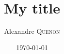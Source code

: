 \documentclass[%
	papersize=a4,%
	pagelayout=default,%
	fontname=latinmodern,%
	fontsize=11pt,%
	twoside,%
	final,%
	faculty=fpms%
]{umons-Thesis}%
\author{Alexandre \textsc{Quenon}}
\date{\today}
\title{My title}
\begin{document}
	
	\umonsThesisTitlePage
\end{document}
